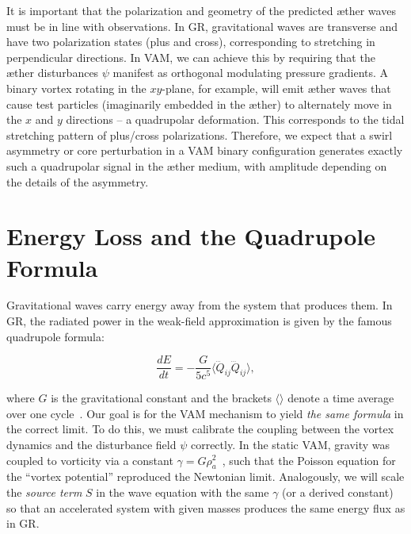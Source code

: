 It is important that the polarization and geometry of the predicted æther waves must be in line with observations. In GR, gravitational waves are transverse and have two polarization states (plus and cross), corresponding to stretching in perpendicular directions. In VAM, we can achieve this by requiring that the æther disturbances $\psi$ manifest as orthogonal modulating pressure gradients. A binary vortex rotating in the $xy$-plane, for example, will emit æther waves that cause test particles (imaginarily embedded in the æther) to alternately move in the $x$ and $y$ directions – a quadrupolar deformation. This corresponds to the tidal stretching pattern of plus/cross polarizations. Therefore, we expect that a swirl asymmetry or core perturbation in a VAM binary configuration generates exactly such a quadrupolar signal in the æther medium, with amplitude depending on the details of the asymmetry.

\section*{Energy Loss and the Quadrupole Formula}
Gravitational waves carry energy away from the system that produces them. In GR, the radiated power in the weak-field approximation is given by the famous quadrupole formula:

\[
\frac{dE}{dt} = -\frac{G}{5c^5} \langle \dddot{Q}_{ij} \dddot{Q}_{ij} \rangle,
\]

where $G$ is the gravitational constant and the brackets $\langle \rangle$ denote a time average over one cycle~\cite{iskandarani2025VAM3}. Our goal is for the VAM mechanism to yield \textit{the same formula} in the correct limit. To do this, we must calibrate the coupling between the vortex dynamics and the disturbance field $\psi$ correctly. In the static VAM, gravity was coupled to vorticity via a constant $\gamma = G \rho_a^2$~\cite{iskandarani2025VAM2}, such that the Poisson equation for the “vortex potential” reproduced the Newtonian limit. Analogously, we will scale the \textit{source term} $S$ in the wave equation with the same $\gamma$ (or a derived constant) so that an accelerated system with given masses produces the same energy flux as in GR.

